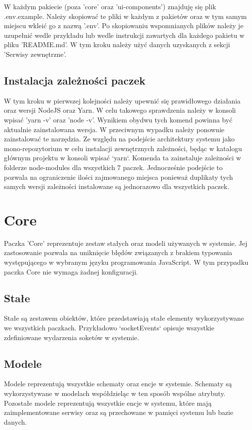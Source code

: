 W każdym pakiecie (poza 'core' oraz 'ui-components') znajduję się plik .env.example. Należy skopiować te pliki w każdym z pakietów oraz w tym samym miejscu wkleić go z nazwą '.env'. Po skopiowaniu wspomnianych plików należy je uzupełnić wedle przykładu lub wedle instrukcji zawartych dla każdego pakietu w pliku 'README.md'. W tym kroku należy użyć danych uzyskanych z sekcji 'Serwisy zewnętrzne'.

\subsection{Instalacja zależności paczek}

W tym kroku w pierwszej kolejności należy upewnić się prawidłowego działania oraz wersji NodeJS oraz Yarn. W celu takowego sprawdzenia należy w konsoli wpisać 'yarn -v' oraz 'node -v'. Wynikiem obydwu tych komend powinna być aktualnie zainstalowana wersja. W przeciwnym wypadku należy ponownie zainstalować te narzędzia.
Ze względu na podejście architektury systemu jako mono-repozytorium w celu instalacji zewnętrznych zależności, będąc w katalogu głównym projektu w konsoli wpisać `yarn`. Komenda ta zainstaluje zależności w folderze node-modules dla wszystkich 7 paczek. Jednocześnie podejście to pozwala na ograniczenie ilości zajmowanego miejsca ponieważ duplikaty tych samych wersji zależności instalowane są jednorazowo dla wszystkich paczek.


\section{Core}
Paczka 'Core' reprezentuje zestaw stałych oraz modeli używanych w systemie. Jej zastosowanie pozwala na uniknięcie błędów związanych z brakiem typowania występującego w wybranym języku programowania
JavaScript. W tym przypadku paczka Core nie wymaga żadnej konfiguracji.

\subsection{Stałe}
Stałe są zestawem obiektów, które przedstawiają stałe elementy wykorzystywane we wszystkich paczkach. Przykładowo `socketEvents` opisuje wszystkie zdefiniowane wydarzenia soketów w systemie.

\subsection{Modele}

Modele reprezentują wszystkie schematy oraz encje w systemie.
Schematy są wykorzystywane w modelach współdzieląc w ten sposób wspólne atrybuty. Pozostałe modele reprezentują wszystkie encje w systemu, które mają zaimplementowane serwisy oraz są przechowane w pamięci systemu lub bazie danych.

